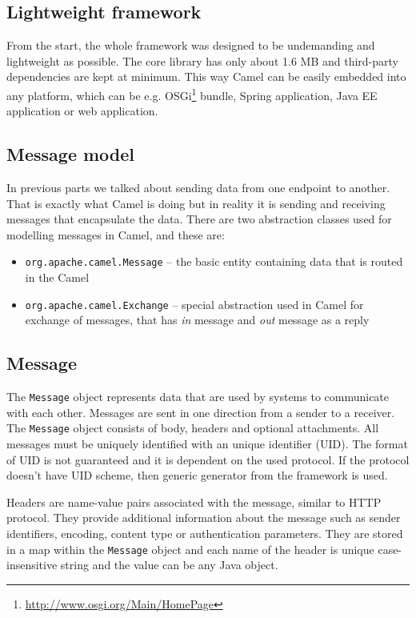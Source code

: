 \documentclass[12pt,final,oneside]{fithesis2}
\begin{document}
\subsection*{Lightweight framework}
From the start, the whole framework was designed to be undemanding and lightweight as possible. The core library has only about 1.6 MB and third-party dependencies are kept at minimum. This way Camel can be easily embedded into any platform, which can be e.g. OSGi\footnote{\url{http://www.osgi.org/Main/HomePage}} bundle, Spring application, Java EE application or web application. 

\subsection{Message model}
In previous parts we talked about sending data from one endpoint to another. That is exactly what Camel is doing but in reality it is sending and receiving messages that encapsulate the data. There are two abstraction classes used for modelling messages in Camel, and these are:
\begin{itemize}
\item
\texttt{org.apache.camel.Message} -- the basic entity containing data that is routed in the Camel 

\item
\texttt{org.apache.camel.Exchange} -- special abstraction used in Camel for exchange of messages, that has \textit{in} message and \textit{out} message as a reply

\end{itemize} 

\subsection*{Message}
The \texttt{Message} object represents data that are used by systems to communicate with each other. Messages are sent in one direction from a sender to a receiver. The \texttt{Message} object consists of body, headers and optional attachments. All messages must be uniquely identified with an unique identifier (UID). The format of UID is not guaranteed and it is dependent on the used protocol. If the protocol doesn't have UID scheme, then generic generator from the framework is used.

Headers are name-value pairs associated with the message, similar to HTTP protocol. They provide additional information about the message such as sender identifiers, encoding, content type or authentication parameters. They are stored in a map within the \texttt{Message} object and each name of the header is unique case-insensitive string and the value can be any Java object.
\end{document}
